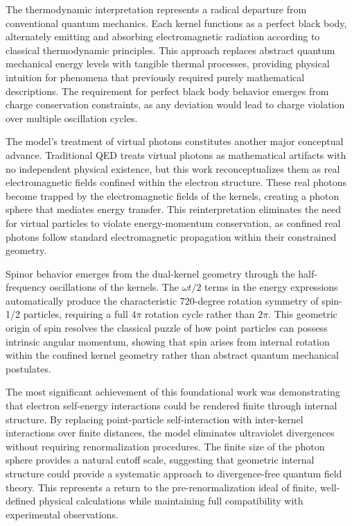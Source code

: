 \documentclass[%
 reprint,
 amsmath,amssymb,
 aps,
]{revtex4-1}
\numberwithin{equation}{section}%
\begin{document}
The thermodynamic interpretation represents a radical departure from conventional quantum mechanics. Each kernel functions as a perfect black body, alternately emitting and absorbing electromagnetic radiation according to classical thermodynamic principles. This approach replaces abstract quantum mechanical energy levels with tangible thermal processes, providing physical intuition for phenomena that previously required purely mathematical descriptions. The requirement for perfect black body behavior emerges from charge conservation constraints, as any deviation would lead to charge violation over multiple oscillation cycles.

The model's treatment of virtual photons constitutes another major conceptual advance. Traditional QED treats virtual photons as mathematical artifacts with no independent physical existence, but this work reconceptualizes them as real electromagnetic fields confined within the electron structure. These real photons become trapped by the electromagnetic fields of the kernels, creating a photon sphere that mediates energy transfer. This reinterpretation eliminates the need for virtual particles to violate energy-momentum conservation, as confined real photons follow standard electromagnetic propagation within their constrained geometry.

Spinor behavior emerges from the dual-kernel geometry through the half-frequency oscillations of the kernels. The $\omega t/2$ terms in the energy expressions automatically produce the characteristic 720-degree rotation symmetry of spin-1/2 particles, requiring a full $4\pi$ rotation cycle rather than $2\pi$. This geometric origin of spin resolves the classical puzzle of how point particles can possess intrinsic angular momentum, showing that spin arises from internal rotation within the confined kernel geometry rather than abstract quantum mechanical postulates.

The most significant achievement of this foundational work was demonstrating that electron self-energy interactions could be rendered finite through internal structure. By replacing point-particle self-interaction with inter-kernel interactions over finite distances, the model eliminates ultraviolet divergences without requiring renormalization procedures. The finite size of the photon sphere provides a natural cutoff scale, suggesting that geometric internal structure could provide a systematic approach to divergence-free quantum field theory. This represents a return to the pre-renormalization ideal of finite, well-defined physical calculations while maintaining full compatibility with experimental observations.
\end{document}
